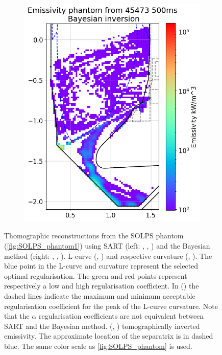\begin{figure}
\begin{subfigure}{0.49\linewidth}
         \includegraphics[trim={10 5 0 45},clip,width=\textwidth]{Chapters/chapter2/figs/inversion_comparison_emissivity_SOLPS_pantom_test-Bayes.png}
         \caption{}
         \label{fig:SOLPS_phantom2f}
     \end{subfigure}
     \caption{Thomographic reconstructions from the SOLPS phantom (\autoref{fig:SOLPS_phantom1}) using SART (left: , , ) and the Bayesian method (right: , , ). L-curve (, ) and respective curvature (, ). The blue point in the L-curve and curvature represent the selected optimal regularisation. The green and red points represent respectively a low and high regularisation coefficient. In () the dashed lines indicate the maximum and minimum acceptable regularisation coefficient for the peak of the L-curve curvature. Note that the $\alpha$ regularisation coefficients are not equivalent between SART and the Bayesian method. (, ) tomographically inverted emissivity. The approximate location of the separatrix is in dashed blue. The same color scale as \autoref{fig:SOLPS_phantom} is used.}
    \label{fig:SOLPS_phantom2}
\end{figure}

